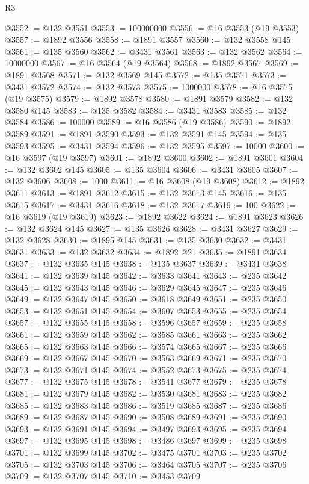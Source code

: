 \begin{lexlean}{R3}
\begin{coremodule}
@3552 := @132 @3551
@3553 := 100000000
@3556 := @16 @3553 (@19 @3553)
@3557 := @1892 @3556
@3558 := @1891 @3557
@3560 := @132 @3558 @145
@3561 := @135 @3560
@3562 := @3431 @3561
@3563 := @132 @3562
@3564 := 10000000
@3567 := @16 @3564 (@19 @3564)
@3568 := @1892 @3567
@3569 := @1891 @3568
@3571 := @132 @3569 @145
@3572 := @135 @3571
@3573 := @3431 @3572
@3574 := @132 @3573
@3575 := 1000000
@3578 := @16 @3575 (@19 @3575)
@3579 := @1892 @3578
@3580 := @1891 @3579
@3582 := @132 @3580 @145
@3583 := @135 @3582
@3584 := @3431 @3583
@3585 := @132 @3584
@3586 := 100000
@3589 := @16 @3586 (@19 @3586)
@3590 := @1892 @3589
@3591 := @1891 @3590
@3593 := @132 @3591 @145
@3594 := @135 @3593
@3595 := @3431 @3594
@3596 := @132 @3595
@3597 := 10000
@3600 := @16 @3597 (@19 @3597)
@3601 := @1892 @3600
@3602 := @1891 @3601
@3604 := @132 @3602 @145
@3605 := @135 @3604
@3606 := @3431 @3605
@3607 := @132 @3606
@3608 := 1000
@3611 := @16 @3608 (@19 @3608)
@3612 := @1892 @3611
@3613 := @1891 @3612
@3615 := @132 @3613 @145
@3616 := @135 @3615
@3617 := @3431 @3616
@3618 := @132 @3617
@3619 := 100
@3622 := @16 @3619 (@19 @3619)
@3623 := @1892 @3622
@3624 := @1891 @3623
@3626 := @132 @3624 @145
@3627 := @135 @3626
@3628 := @3431 @3627
@3629 := @132 @3628
@3630 := @1895 @145
@3631 := @135 @3630
@3632 := @3431 @3631
@3633 := @132 @3632
@3634 := @1892 @21
@3635 := @1891 @3634
@3637 := @132 @3635 @145
@3638 := @135 @3637
@3639 := @3431 @3638
@3641 := @132 @3639 @145
@3642 := @3633 @3641
@3643 := @235 @3642
@3645 := @132 @3643 @145
@3646 := @3629 @3645
@3647 := @235 @3646
@3649 := @132 @3647 @145
@3650 := @3618 @3649
@3651 := @235 @3650
@3653 := @132 @3651 @145
@3654 := @3607 @3653
@3655 := @235 @3654
@3657 := @132 @3655 @145
@3658 := @3596 @3657
@3659 := @235 @3658
@3661 := @132 @3659 @145
@3662 := @3585 @3661
@3663 := @235 @3662
@3665 := @132 @3663 @145
@3666 := @3574 @3665
@3667 := @235 @3666
@3669 := @132 @3667 @145
@3670 := @3563 @3669
@3671 := @235 @3670
@3673 := @132 @3671 @145
@3674 := @3552 @3673
@3675 := @235 @3674
@3677 := @132 @3675 @145
@3678 := @3541 @3677
@3679 := @235 @3678
@3681 := @132 @3679 @145
@3682 := @3530 @3681
@3683 := @235 @3682
@3685 := @132 @3683 @145
@3686 := @3519 @3685
@3687 := @235 @3686
@3689 := @132 @3687 @145
@3690 := @3508 @3689
@3691 := @235 @3690
@3693 := @132 @3691 @145
@3694 := @3497 @3693
@3695 := @235 @3694
@3697 := @132 @3695 @145
@3698 := @3486 @3697
@3699 := @235 @3698
@3701 := @132 @3699 @145
@3702 := @3475 @3701
@3703 := @235 @3702
@3705 := @132 @3703 @145
@3706 := @3464 @3705
@3707 := @235 @3706
@3709 := @132 @3707 @145
@3710 := @3453 @3709

\end{coremodule}
\end{lexlean}
